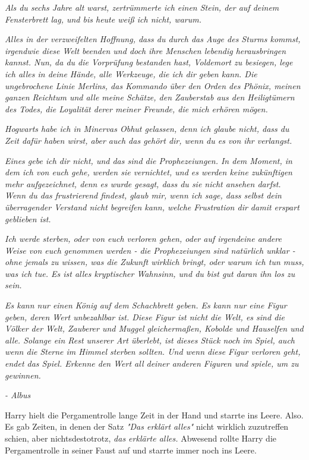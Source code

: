 {\emph{Als du sechs Jahre alt warst, zertrümmerte ich einen Stein, der auf deinem Fensterbrett lag, und bis heute weiß ich nicht, warum.}

\emph{\hfill\break Alles in der verzweifelten Hoffnung, dass du durch das Auge des Sturms kommst, irgendwie diese Welt beenden und doch ihre Menschen lebendig herausbringen kannst. Nun, da du die Vorprüfung bestanden hast, Voldemort zu besiegen, lege ich alles in deine Hände, alle Werkzeuge, die ich dir geben kann. Die ungebrochene Linie Merlins, das Kommando über den Orden des Phönix, meinen ganzen Reichtum und alle meine Schätze, den Zauberstab aus den Heiligtümern des Todes, die Loyalität derer meiner Freunde, die mich erhören mögen.}

\emph{\hfill\break Hogwarts habe ich in Minervas Obhut gelassen, denn ich glaube nicht, dass du Zeit dafür haben wirst, aber auch das gehört dir, wenn du es von ihr verlangst.}

\emph{\hfill\break Eines gebe ich dir nicht, und das sind die Prophezeiungen. In dem Moment, in dem ich von euch gehe, werden sie vernichtet, und es werden keine zukünftigen mehr aufgezeichnet, denn es wurde gesagt, dass du sie nicht ansehen darfst. Wenn du das frustrierend findest, glaub mir, wenn ich sage, dass selbst dein überragender Verstand nicht begreifen kann, welche Frustration dir damit erspart geblieben ist.}

\emph{\hfill\break Ich werde sterben, oder von euch verloren gehen, oder auf irgendeine andere Weise von euch genommen werden - die Prophezeiungen sind natürlich unklar - ohne jemals zu wissen, was die Zukunft wirklich bringt, oder warum ich tun muss, was ich tue. Es ist alles kryptischer Wahnsinn, und du bist gut daran ihn los zu sein.}

\emph{Es kann nur einen König auf dem Schachbrett geben. Es kann nur eine Figur geben, deren Wert unbezahlbar ist. Diese Figur ist nicht die Welt, es sind die Völker der Welt, Zauberer und Muggel gleichermaßen, Kobolde und Hauselfen und alle. Solange ein Rest unserer Art überlebt, ist dieses Stück noch im Spiel, auch wenn die Sterne im Himmel sterben sollten. Und wenn diese Figur verloren geht, endet das Spiel. Erkenne den Wert all deiner anderen Figuren und spiele, um zu gewinnen.}

\emph{\hfill\break - Albus}

Harry hielt die Pergamentrolle lange Zeit in der Hand und starrte ins Leere. Also. Es gab Zeiten, in denen der Satz \emph{"Das erklärt alles"} nicht wirklich zuzutreffen schien, aber nichtsdestotrotz, \emph{das erklärte alles.} Abwesend rollte Harry die Pergamentrolle in seiner Faust auf und starrte immer noch ins Leere.

}
